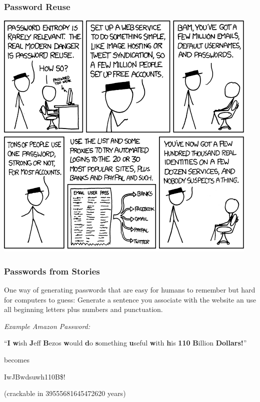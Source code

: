 \documentclass[aspectratio=169,dvipsnames]{beamer}
\begin{document}
\begin{frame}
\frametitle{Password Reuse}
\begin{center}
\includegraphics[scale=0.43]{images/password_reuse.png} 
\end{center}
\end{frame}

\begin{frame}[fragile]
\frametitle{Passwords from Stories}

One way of generating passwords that are easy for humans to remember but hard for computers to guess: Generate a sentence you associate with the website an use all beginning letters plus numbers and punctuation.
\pause\bigskip\bigskip

\emph{Example Amazon Password:}
\begin{center}
\large
``\textbf{I} \textbf{w}ish \textbf{J}eff \textbf{B}ezos \textbf{w}ould \textbf{d}o
\textbf{s}omething \textbf{u}seful \textbf{w}ith \textbf{h}is \textbf{110} \textbf{B}illion \textbf{Dollars!}''
\bigskip

becomes
\bigskip

IwJBwdsuwh110B\$!
\end{center}
\begin{flushright}
\small
(crackable in 39555681645472620 years)
\end{flushright}

\normalsize
\end{frame}
\end{document}
